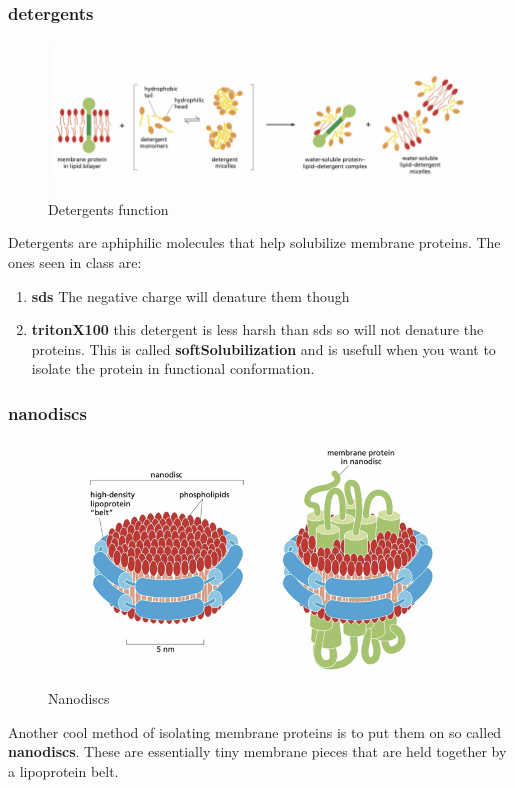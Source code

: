 \documentclass[../main.tex]{subfiles}
\begin{document}
\subsubsection{detergents}

\begin{figure}[H]
    \centering
    \includegraphics[width=\linewidth]{detergents.png}
    \caption{Detergents function}
    \label{fig:enter-label}
\end{figure}
Detergents are aphiphilic molecules that help solubilize membrane proteins. The ones seen in class are:
\begin{enumerate}
    \item \textbf{\gls{sds}} The negative charge will denature them though
    \item \textbf{\gls{tritonX100}} this detergent is less harsh than sds so will not denature the proteins. This is called \textbf{\gls{softSolubilization}} and is usefull when you want to isolate the protein in functional conformation.
    
\end{enumerate}


\subsubsection{nanodiscs}
\begin{figure}[H]
    \centering
    \includegraphics[width=0.5\linewidth]{nanodiscs.png}
    \caption{Nanodiscs}
    \label{fig:enter-label}
\end{figure}
Another cool method of isolating membrane proteins is to put them on so called \textbf{nanodiscs}. These are essentially tiny membrane pieces that are held together by a lipoprotein belt. 
\end{document}
